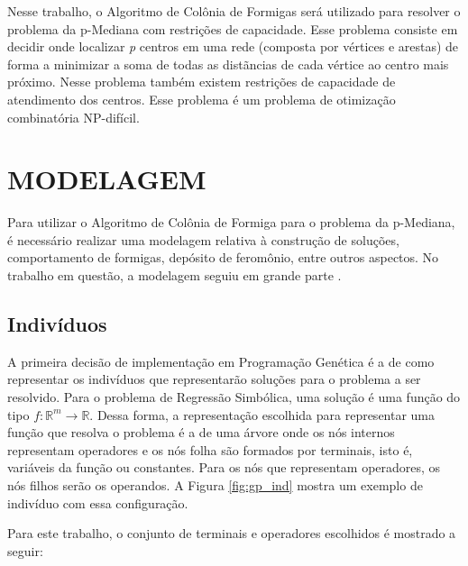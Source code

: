 \documentclass[12pt]{article}
\begin{document}
Nesse trabalho, o Algoritmo de Colônia de Formigas será utilizado para resolver o problema da p-Mediana
com restrições de capacidade. Esse problema consiste em decidir onde localizar \textit{p} centros em uma
rede (composta por vértices e arestas) de forma a minimizar a soma de todas as distãncias de cada vértice
ao centro mais próximo. Nesse problema também existem restrições de capacidade de atendimento dos centros.
Esse problema é um problema de otimização combinatória NP-difícil.

\section{MODELAGEM} \label{sec:model}

Para utilizar o Algoritmo de Colônia de Formiga para o problema da p-Mediana, é necessário realizar uma
modelagem relativa à construção de soluções, comportamento de formigas, depósito de feromônio, entre outros
aspectos. No trabalho em questão, a modelagem seguiu em grande parte \cite{DBLP:journals/informaticaSI/FrancaZC05}.

\subsection{Indivíduos} \label{sec:ind}

A primeira decisão de implementação em Programação Genética é a de como representar
os indivíduos que representarão soluções para o problema a ser resolvido. Para o
problema de Regressão Simbólica, uma solução é uma função do tipo
$ f:\mathbb{R}^{m} \rightarrow \mathbb{R} $. Dessa forma, a representação escolhida
para representar uma função que resolva o problema é a de uma árvore onde os nós
internos representam operadores e os nós folha são formados por terminais, isto é,
variáveis da função ou constantes. Para os nós que representam operadores, os nós filhos
serão os operandos. A Figura \ref{fig:gp_ind} mostra um exemplo de indivíduo com essa
configuração.

Para este trabalho, o conjunto de terminais e operadores escolhidos é mostrado a seguir:
\end{document}
